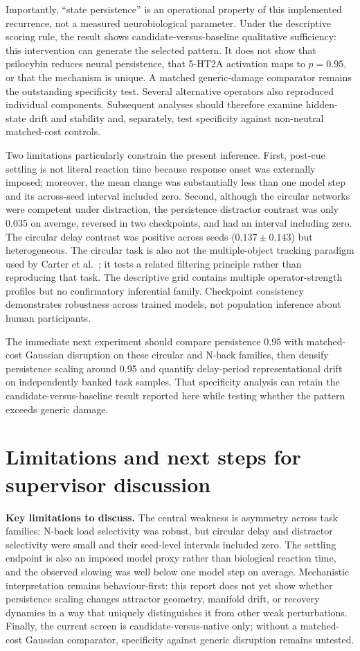 \documentclass[11pt,reprint,aps,prl,floatfix,secnumarabic]{revtex4-2}
\begin{document}
Importantly, ``state persistence'' is an operational property of this
implemented recurrence, not a measured neurobiological parameter. Under the
descriptive scoring rule, the result shows candidate-versus-baseline qualitative
sufficiency: this intervention can generate the selected pattern. It does not
show that psilocybin reduces neural persistence, that 5-HT2A activation maps to
$p=0.95$, or that the mechanism is unique. A matched generic-damage comparator
remains the outstanding specificity test. Several alternative operators also
reproduced individual components. Subsequent analyses should therefore examine
hidden-state drift and stability and, separately, test specificity against
non-neutral matched-cost controls.

Two limitations particularly constrain the present inference. First, post-cue
settling is not literal reaction time because response onset was externally
imposed; moreover, the mean change was substantially less than one model step
and its across-seed interval included zero. Second, although the circular
networks were competent under distraction, the persistence distractor contrast
was only 0.035 on average, reversed in two checkpoints, and had an interval
including zero. The circular delay contrast was positive across seeds
($0.137\pm0.143$) but heterogeneous. The circular task is also not the
multiple-object tracking
paradigm used by Carter et al.\ \cite{carter2005}; it tests a related filtering
principle rather than reproducing that task. The descriptive grid contains
multiple operator-strength profiles but no confirmatory inferential family.
Checkpoint consistency demonstrates robustness across trained models, not
population inference about human participants.

The immediate next experiment should compare persistence $0.95$ with
matched-cost Gaussian disruption on these circular and N-back families, then
densify persistence scaling around 0.95 and quantify delay-period
representational drift on independently banked task samples. That specificity
analysis can retain the candidate-versus-baseline result reported here while
testing whether the pattern exceeds generic damage.

\section{Limitations and next steps for supervisor discussion}

\textbf{Key limitations to discuss.}
The central weakness is asymmetry across task families: N-back load selectivity
was robust, but circular delay and distractor selectivity were small and their
seed-level intervals included zero. The settling endpoint is also an imposed
model proxy rather than biological reaction time, and the observed slowing was
well below one model step on average. Mechanistic interpretation remains
behaviour-first: this report does not yet show whether persistence scaling
changes attractor geometry, manifold drift, or recovery dynamics in a way that
uniquely distinguishes it from other weak perturbations. Finally, the current
screen is candidate-versus-native only; without a matched-cost Gaussian
comparator, specificity against generic disruption remains untested.
\end{document}
